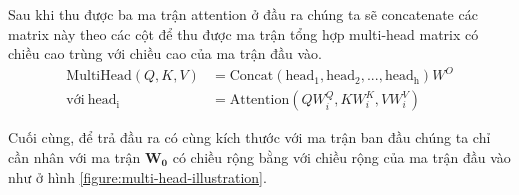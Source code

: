 \begin{enumerate}[label=\textbf{\arabic*}]
          Sau khi thu được ba ma trận attention ở đầu ra chúng ta sẽ concatenate các matrix này theo các cột để thu được ma trận tổng hợp multi-head matrix có chiều cao trùng với chiều cao của ma trận đầu vào.
          \begin{align}
              \mathrm{MultiHead}(Q, K, V) & = \mathrm{Concat}(\mathrm{head_1},\mathrm{head_2}, ..., \mathrm{head_h})W^O \\
              \text{với}~\mathrm{head_i}  & = \mathrm{Attention}(QW^Q_i, KW^K_i, VW^V_i)
          \end{align}


          Cuối cùng, để trả đầu ra có cùng kích thước với ma trận ban đầu chúng ta chỉ cần nhân với ma trận $\mathbf{W}_\mathbf{0}$ có chiều rộng bằng với chiều rộng của ma trận đầu vào như ở hình \ref{figure:multi-head-illustration}.
\end{enumerate}
